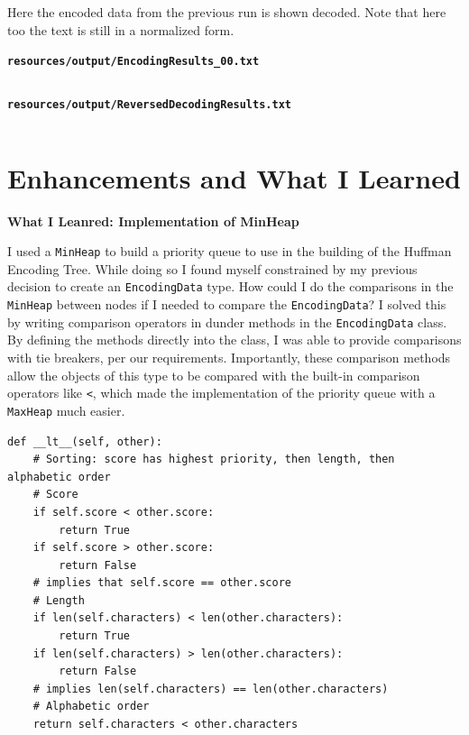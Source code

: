 \documentclass[10pt,letterpaper,final]{report}
\begin{document}
\begin{landscape}
\medskip

Here the encoded data from the previous run is shown decoded. Note that here too the text is still in a normalized form.
\begin{center}
  \begin{minipage}[t]{0.6\textwidth}
    \centering
    \textbf{\texttt{resources/output/EncodingResults_00.txt}}\\
    \inputminted[linenos, breaklines, breakanywhere, frame=single,fontsize=\footnotesize]{text}{resources/output/EncodingResults_00.txt}
  \end{minipage}\hfill
  \begin{minipage}[t]{0.6\textwidth}
    \centering
    \textbf{\texttt{resources/output/ReversedDecodingResults.txt}}\\
    \inputminted[linenos, breaklines, breakanywhere, fontsize=\footnotesize, frame=single, fontsize=\footnotesize]{text}{resources/output/ReversedDecodingResults.txt}
  \end{minipage}
\end{center}
\end{landscape}

\pagebreak
\section{Enhancements and What I Learned}\label{sec:enhancements-and-what-I-learned}

\noindent \textbf{What I Leanred: Implementation of MinHeap}

I used a \texttt{MinHeap} to build a priority queue to use in the building of the Huffman Encoding Tree. While doing so I found myself constrained by my previous decision to create an \texttt{EncodingData} type. How could I do the comparisons in the \texttt{MinHeap} between nodes if I needed to compare the \texttt{EncodingData}? I solved this by writing comparison operators in dunder methods in the \texttt{EncodingData} class. By defining the methods directly into the class, I was able to provide comparisons with tie breakers, per our requirements. Importantly, these comparison methods allow the objects of this type to be compared with the built-in comparison operators like \texttt{<}, which made the implementation of the priority queue with a \texttt{MaxHeap} much easier.

\begin{verbatim}
def __lt__(self, other):
    # Sorting: score has highest priority, then length, then alphabetic order
    # Score
    if self.score < other.score:
        return True
    if self.score > other.score:
        return False
    # implies that self.score == other.score
    # Length
    if len(self.characters) < len(other.characters):
        return True
    if len(self.characters) > len(other.characters):
        return False
    # implies len(self.characters) == len(other.characters)
    # Alphabetic order
    return self.characters < other.characters
\end{verbatim}
\end{document}
